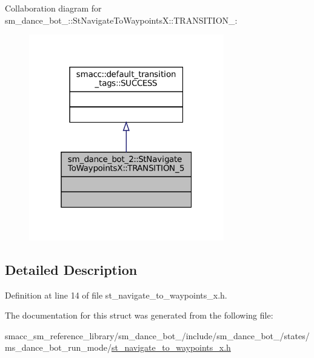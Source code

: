 Collaboration diagram for sm\+\_\+dance\+\_\+bot\+\_\+:\+:St\+Navigate\+To\+WaypointsX\+:\+:T\+R\+A\+N\+S\+I\+T\+I\+O\+N\+\_\+:
\nopagebreak
\begin{figure}[H]
\begin{center}
\leavevmode
\includegraphics[width=241pt]{structsm__dance__bot__2_1_1StNavigateToWaypointsX_1_1TRANSITION__5__coll__graph}
\end{center}
\end{figure}


\subsection{Detailed Description}


Definition at line 14 of file st\+\_\+navigate\+\_\+to\+\_\+waypoints\+\_\+x.\+h.



The documentation for this struct was generated from the following file\+:\begin{DoxyCompactItemize}
\item 
smacc\+\_\+sm\+\_\+reference\+\_\+library/sm\+\_\+dance\+\_\+bot\+\_/include/sm\+\_\+dance\+\_\+bot\+\_/states/ms\+\_\+dance\+\_\+bot\+\_\+run\+\_\+mode/\hyperlink{2_2include_2sm__dance__bot__2_2states_2ms__dance__bot__run__mode_2st__navigate__to__waypoints__x_8h}{st\+\_\+navigate\+\_\+to\+\_\+waypoints\+\_\+x.\+h}\end{DoxyCompactItemize}

